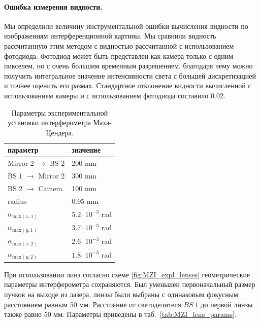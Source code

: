 \paragraph{Ошибка измерения видности.}
Мы определили величину инструментальной ошибки вычисления видности по изображениям интерференционной картины. Мы сравнили видность рассчитанную этим методом с видностью рассчитанной с использованием фотодиода. Фотодиод может быть представлен как камера только с одним пикселем, но с очень большим временным разрешением, благодаря чему можно получить интегральное значение интенсивности света с большей дискретизацией и точнее оценить его размах. Стандартное отклонение видности вычисленной с использованием камеры и с использованием фотодиода составило $0.02$.


\begin{table} [htbp]
    \centering
    \begin{threeparttable}
        \caption{Параметры экспериментальной установки интерферометра Маха-Цендера.}\label{tab:MZI_params}
        \begin{tabular}{| p{5cm} || p{5cm} |}
            \hline
            \hline
            параметр & значение \\
            \hline
            Mirror 2 $\to$ BS 2 & 200 mm\\
            BS 1 $\to$ Mirror 2 & 300 mm\\
            BS 2 $\to$ Camera & 100 mm\\
            radius & 0.95 mm\\
            $\alpha_{{\mathrm{max}}(x,1)}$ & $5.2 \cdot 10^{-3}$ rad\\
            $\alpha_{{\mathrm{max}}(y,1)}$ & $3.7 \cdot 10^{-3}$ rad\\
            $\alpha_{{\mathrm{max}}(x,2)}$ & $2.6 \cdot 10^{-3}$ rad\\
            $\alpha_{{\mathrm{max}}(y,2)}$ & $1.8 \cdot 10^{-3}$ rad\\
            \hline
            \hline
        \end{tabular}
    \end{threeparttable}
\end{table}

При использовании линз согласно схеме \ref{fig:MZI_expl_lenses} геометрические параметры интерферометра сохраняются. Был уменьшен первоначальный размер пучков на выходе из лазера, линзы были выбраны с одинаковым фокусным расстоянием равным 50 мм. Расстояние от светоделителя $BS\ 1$ до первой линзы также равно 50 мм. Параметры приведены в таб.~\ref{tab:MZI_lens_params}. 

